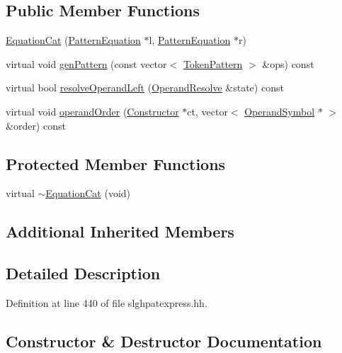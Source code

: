 \subsection*{Public Member Functions}
\begin{DoxyCompactItemize}
\item 
\mbox{\hyperlink{class_equation_cat_a1c0608fc808e9344ef7b498e0175e7e8}{Equation\+Cat}} (\mbox{\hyperlink{class_pattern_equation}{Pattern\+Equation}} $\ast$l, \mbox{\hyperlink{class_pattern_equation}{Pattern\+Equation}} $\ast$r)
\item 
virtual void \mbox{\hyperlink{class_equation_cat_ad5322f8ad27062ff5c195c392334b299}{gen\+Pattern}} (const vector$<$ \mbox{\hyperlink{class_token_pattern}{Token\+Pattern}} $>$ \&ops) const
\item 
virtual bool \mbox{\hyperlink{class_equation_cat_a1c2557c53605b96ab6888ea55d8f5964}{resolve\+Operand\+Left}} (\mbox{\hyperlink{struct_operand_resolve}{Operand\+Resolve}} \&state) const
\item 
virtual void \mbox{\hyperlink{class_equation_cat_a3504199664351bffd3aeb8b6e8246fec}{operand\+Order}} (\mbox{\hyperlink{class_constructor}{Constructor}} $\ast$ct, vector$<$ \mbox{\hyperlink{class_operand_symbol}{Operand\+Symbol}} $\ast$ $>$ \&order) const
\end{DoxyCompactItemize}
\subsection*{Protected Member Functions}
\begin{DoxyCompactItemize}
\item 
virtual \mbox{\hyperlink{class_equation_cat_a0141c016c1d90e2a56135ae21c07fabb}{$\sim$\+Equation\+Cat}} (void)
\end{DoxyCompactItemize}
\subsection*{Additional Inherited Members}


\subsection{Detailed Description}


Definition at line 440 of file slghpatexpress.\+hh.



\subsection{Constructor \& Destructor Documentation}
\mbox{\label{class_equation_cat_a0141c016c1d90e2a56135ae21c07fabb}} 
